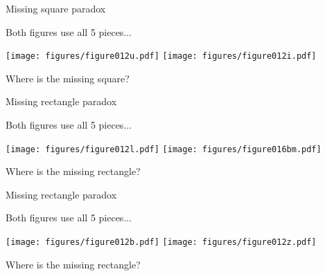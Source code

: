 \documentclass[14pt]{beamer}
\begin{document}

    \begin{frame}{Missing square paradox}
        \begin{center}
            Both figures use all 5 pieces...

            \vspace{8pt}

            \;\;\texttt{[image: figures/figure012u.pdf]}\qquad
            \qquad
            \texttt{[image: figures/figure012i.pdf]}\;

            \vspace{32pt}

            Where is the missing square?
        \end{center}
    \end{frame}


    \begin{frame}{Missing rectangle paradox}
        \begin{center}
            Both figures use all 5 pieces...

            \vspace{44pt}

            \texttt{[image: figures/figure012l.pdf]}\;
            \;\;
            \texttt{[image: figures/figure016bm.pdf]}

            \vspace{32pt}

            Where is the missing rectangle?
        \end{center}
    \end{frame}


    \begin{frame}{Missing rectangle paradox}
        \begin{center}
            Both figures use all 5 pieces...

            \vspace{36pt}

            \;\;\texttt{[image: figures/figure012b.pdf]}\qquad
            \qquad
            \texttt{[image: figures/figure012z.pdf]}

            \vspace{32pt}

            Where is the missing rectangle?
        \end{center}
    \end{frame}
\end{document}
